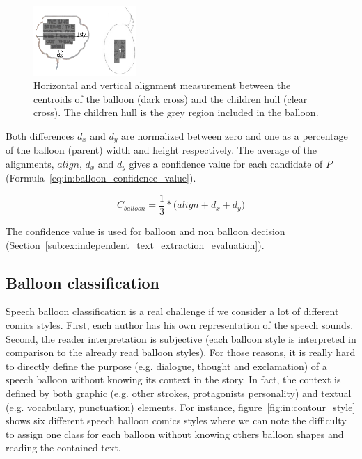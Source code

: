     \begin{figure}[ht]%
      \centering
      \includegraphics[trim= 0px 15px 80px 24px, clip, width=0.35\textwidth]{coaxial_alignment.png}
    \caption[Balloon content alignment measures]{Horizontal and vertical alignment measurement between the centroids of the balloon (dark cross) and the children hull (clear cross). The children hull is the grey region included in the balloon.}
    \label{fig:in:coaxial_alignment}
    \end{figure}

Both differences $d_x$ and $d_y$ are normalized between zero and one as a percentage of the balloon (parent) width and height respectively.
The average of the alignments, $\overline{align}$, $d_x$ and $d_y$ gives a confidence value for each candidate of $P$ (Formula~\ref{eq:in:balloon_confidence_value}).

\begin{equation}
	\label{eq:in:balloon_confidence_value}
	C_{balloon} = \frac{1}{3} * \Big( \overline{align} + d_x + d_y \Big)
\end{equation}

The confidence value is used for balloon and non balloon decision (Section~\ref{sub:ex:independent_text_extraction_evaluation}).



\subsection{Balloon classification} %
\label{sub:in:balloon_classification}

Speech balloon classification is a real challenge if we consider a lot of different comics styles.
First, each author has his own representation of the speech sounds. Second, the reader interpretation is subjective (each balloon style is interpreted in comparison to the already read balloon styles).
For those reasons, it is really hard to directly define the purpose (e.g. dialogue, thought and exclamation) of a speech balloon without knowing its context in the story.
In fact, the context is defined by both graphic (e.g. other strokes, protagonists personality) and textual (e.g. vocabulary, punctuation) elements.
For instance, figure~\ref{fig:in:contour_style} shows six different speech balloon comics styles where we can note the difficulty to assign one class for each balloon without knowing others balloon shapes and reading the contained text.

